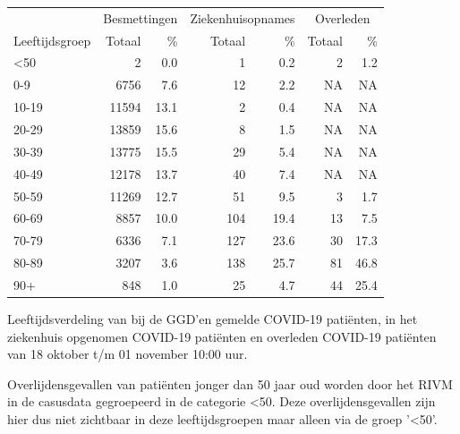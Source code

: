 \documentclass[
  english,
  man,floatsintext]{apa6}
\begin{document}
\begin{table}
\centering\begingroup\fontsize{11}{13}\selectfont

\begin{threeparttable}
\begin{tabular}{lrrrrrr}
\toprule
\multicolumn{1}{c}{ } & \multicolumn{2}{c}{Besmettingen} & \multicolumn{2}{c}{Ziekenhuisopnames} & \multicolumn{2}{c}{Overleden} \\
\cmidrule(l{3pt}r{3pt}){2-3} \cmidrule(l{3pt}r{3pt}){4-5} \cmidrule(l{3pt}r{3pt}){6-7}
Leeftijdsgroep & Totaal & \% & Totaal & \% & Totaal & \%\\
\midrule
<50 & 2 & 0.0 & 1 & 0.2 & 2 & 1.2\\
0-9 & 6756 & 7.6 & 12 & 2.2 & NA & NA\\
10-19 & 11594 & 13.1 & 2 & 0.4 & NA & NA\\
20-29 & 13859 & 15.6 & 8 & 1.5 & NA & NA\\
30-39 & 13775 & 15.5 & 29 & 5.4 & NA & NA\\
40-49 & 12178 & 13.7 & 40 & 7.4 & NA & NA\\
50-59 & 11269 & 12.7 & 51 & 9.5 & 3 & 1.7\\
60-69 & 8857 & 10.0 & 104 & 19.4 & 13 & 7.5\\
70-79 & 6336 & 7.1 & 127 & 23.6 & 30 & 17.3\\
80-89 & 3207 & 3.6 & 138 & 25.7 & 81 & 46.8\\
90+ & 848 & 1.0 & 25 & 4.7 & 44 & 25.4\\
\bottomrule
\end{tabular}
\begin{tablenotes}
\item[1] Leeftijdsverdeling van bij de GGD’en gemelde COVID-19 patiënten, in het ziekenhuis opgenomen COVID-19 patiënten en overleden COVID-19 patiënten van 18 oktober t/m 01 november 10:00 uur.
\item[2] Overlijdensgevallen van patiënten jonger dan 50 jaar oud worden door het RIVM in de casusdata gegroepeerd in de categorie <50. Deze overlijdensgevallen zijn hier dus niet zichtbaar in deze leeftijdsgroepen maar alleen via de groep '<50'.
\end{tablenotes}
\end{threeparttable}
\endgroup{}
\end{table}

\newpage
\end{document}

